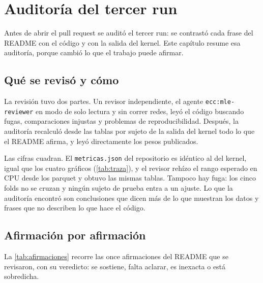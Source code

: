 \chapter{Auditoría del tercer run}\label{cap:auditoria}

\newcommand*{\veredicto}[2]{{\sffamily\bfseries\footnotesize\tikz[baseline=-0.6ex]\fill[#1] (0,0) circle[radius=2.6pt];\,\textcolor{#1}{#2}}}

Antes de abrir el pull request se auditó el tercer run: se contrastó cada frase del README con el código y con la
salida del kernel. Este capítulo resume esa auditoría, porque cambió lo que el trabajo puede afirmar.

\section{Qué se revisó y cómo}

La revisión tuvo dos partes. Un revisor independiente, el agente \texttt{ecc:mle-reviewer} en modo de solo lectura y
sin correr redes, leyó el código buscando fugas, comparaciones injustas y problemas de reproducibilidad. Después, la
auditoría recalculó desde las tablas por sujeto de la salida del kernel todo lo que el README afirma, y leyó
directamente los pesos publicados.

\begin{clave}
Las cifras cuadran. El \texttt{metricas.json} del repositorio es idéntico al del kernel, igual que los cuatro gráficos
(\cref{tab:traza}), y el revisor rehízo el rango esperado en CPU desde los parquet y obtuvo las mismas tablas. Tampoco
hay fuga: los cinco folds no se cruzan y ningún sujeto de prueba entra a un ajuste. Lo que la auditoría encontró son
conclusiones que dicen más de lo que muestran los datos y frases que no describen lo que hace el código.
\end{clave}

\section{Afirmación por afirmación}

La \cref{tab:afirmaciones} recorre las once afirmaciones del README que se revisaron, con su veredicto: se sostiene, falta
aclarar, es inexacta o está sobredicha.

